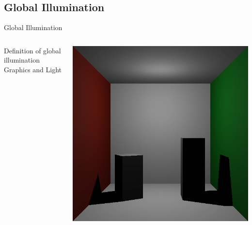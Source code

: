 \documentclass[compress,professionalfont]{beamer}
\begin{document}
\subsection{Global Illumination}
\begin{frame}{Global Illumination}

    \begin{columns}
        \begin{column}{0.65\textwidth}
            Definition of global illumination\\
            Graphics and Light\\

        \end{column}
        \begin{column}{0.35\textwidth}
            \vspace{0mm}
            \includegraphics[width=\textwidth]{../img/boxes_noindirect}
            \vspace{2mm}

\end{column}
\end{columns}
\end{frame}
\end{document}
